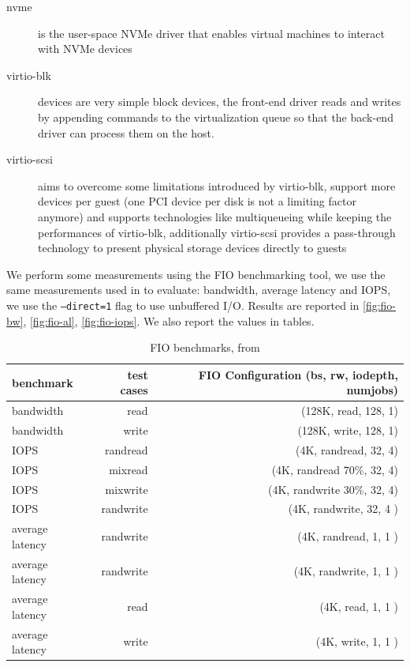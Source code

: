 \documentclass[twocolumn]{article}
\begin{document}
\begin{description}
    \item[nvme] is the user-space NVMe driver that enables virtual machines to interact with NVMe devices
    \item[virtio-blk] devices are very simple block devices, the front-end driver reads and writes by appending commands to the virtualization queue so that the back-end driver can process them on the host.
    \item[virtio-scsi] aims to overcome some limitations introduced by virtio-blk, support more devices per guest (one PCI device per disk is not a limiting factor anymore) and supports technologies like multiqueueing while keeping the performances of virtio-blk, additionally virtio-scsi provides a pass-through technology to present physical storage devices directly to guests
\end{description}

We perform some measurements using the FIO \cite{fio} benchmarking tool, we use the same measurements used in \cite{spool} to evaluate: bandwidth, average latency and IOPS, we use the \texttt{--direct=1} flag to use unbuffered I/O. Results are reported in \ref{fig:fio-bw}, \ref{fig:fio-al}, \ref{fig:fio-iops}. We also report the values in tables.

\begin{table}
    \centering
    \label{tab:fio-benchmarks}
    \begin{tabular}{l|r|r}
        \hline
        \textbf{benchmark} & \textbf{test cases} & \textbf{FIO Configuration (bs, rw, iodepth, numjobs)} \\
        \hline
        bandwidth          &  read               & (128K, read, 128, 1)                                  \\
        bandwidth          & write               & (128K, write, 128, 1)                                 \\
        IOPS               &  randread           &(4K, randread, 32, 4)                                  \\
        IOPS               & mixread             & (4K, randread 70\%, 32, 4)                            \\
        IOPS               &  mixwrite           & (4K, randwrite 30\%, 32, 4)                           \\
        IOPS               &  randwrite          &  (4K, randwrite, 32, 4 )                              \\
        average latency    &  randwrite          & (4K, randread, 1, 1 )                                 \\
        average latency    &  randwrite          & (4K, randwrite, 1, 1 )                                \\
        average latency    &  read               &(4K, read, 1, 1 )                                      \\
        average latency    &  write	             & (4K, write, 1, 1 )                                    \\
    \end{tabular}
    \caption{FIO benchmarks, from \cite{spool}} 
\end{table}
\end{document}
